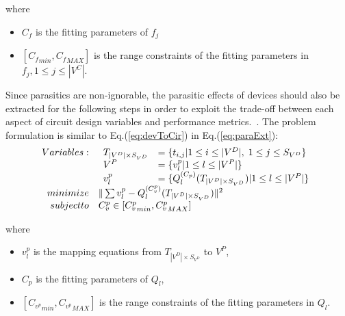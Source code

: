     where
    \begin{itemize}
      \item $C_f$ is the fitting parameters of $f_j$ 
      \item $\left [{C_f}_{min},{C_f}_{MAX}\right]$ is the range constraints of the fitting parameters in $f_j, 1 \leq j \leq |V^C|$.
    \end{itemize}

    Since parasitics are non-ignorable, the parasitic effects of devices should also be extracted for the following steps in order to exploit the trade-off between each aspect of circuit design variables and performance metrics.~\cite{Template_Based_Parasitic_Aware_Layout}. The problem formulation is similar to Eq.(\ref{eq:devToCir}) in Eq.(\ref{eq:paraExt}):
    \begin{align}\label{eq:paraExt}
      \begin{array}[t]{rl}
      Variables:  & \begin{array}[t]{ll}
                      T_{|V^D| \times S_{V^D}} &= \{t_{i,j}| 1 \leq i \leq |V^D|,\; 1 \leq j \leq S_{V^D}\}   \\
                      V^P     & = \{v^p_l|1 \leq l \leq |V^P|\} \\
                      v^p_l   & = \{Q_l^{(C_p)}(T_{|V^D| \times S_{V^D}})| 1 \leq l \leq |V^P| \}
                    \end{array} \\
      minimize    &  \| \sum{v^p_l-Q_l^{(C_v^p)}(T_{|V^D| \times S_{V^D}})}\|^2  \\
      subject to  &  C_v^p \in \left [ {C_v^p}_{min}, {C_v^p}_{MAX}\right] 
      \end{array} 
    \end{align}

    where
    \begin{itemize}\setlength{\itemsep}{2pt}
      \item $v^p_l$ is the mapping equations from $T_{|V^D|\times S_{V^D}}$ to $V^P$, 
      \item $C_p$ is the fitting parameters of $Q_l$,
      \item $\left [ {C_{v^p}}_{min}, {C_{v^p}}_{MAX}\right]$ is the range constraints of the fitting parameters in $Q_l$.
    \end{itemize}

